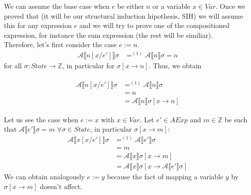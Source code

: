 \documentclass{article}
\begin{document}
\begin{enumerate}
\begin{enumerate}
        We can assume the base case when $e$ be either $n$ or a variable $x \in Var$. Once we proved that (it will be our structural induction hipothesis, SIH) we will assume this for any expression $e$ and we will try to prove one of the compositioned expression, for instance the sum expression (the rest will be similiar).\\
        
        Therefore, let's first consider the case  \mbox{\boldmath $e := n$}.
        \begin{align*}
        \mathcal{A}\llbracket n[x/e'] \rrbracket \sigma &=^{(1)} \mathcal{A}\llbracket n \rrbracket \sigma = n
        \end{align*}
        for all $\sigma: State \longrightarrow \mathbb Z$, in particular for $\sigma [x \rightarrow n ]$. Thus, we obtain
        
        \begin{align*}
        \begin{split}
        \mathcal{A}\llbracket n[x/e'] \rrbracket \sigma & =^{(1)} \mathcal{A}\llbracket n \rrbracket \sigma \\
        & = n \\
        & = \mathcal{A}\llbracket n \rrbracket \sigma [x \rightarrow n]
        \end{split}
        \end{align*}
        
        Let us see the case when \mbox{\boldmath $e := x$} with $x \in Var$. Let $e' \in AExp$ and $m \in \mathbb Z$ be such that $\mathcal{A}\llbracket e' \rrbracket \sigma = m$  $\forall \sigma \in State$, in particular $\sigma [x \rightarrow m]$:
        \begin{equation*}
        \begin{split}
        \mathcal{A}\llbracket x[x/e'] \rrbracket \sigma & =^{(1)} \mathcal{A}\llbracket e' \rrbracket \sigma \\
        & = m\\
        & = \mathcal{A}\llbracket x \rrbracket \sigma[x \rightarrow m] \\
        & = \mathcal{A}\llbracket x \rrbracket \sigma[x \rightarrow \mathcal{A}\llbracket e' \rrbracket \sigma]
        \end{split}
        \end{equation*}
        We can obtain analogously \mbox{\boldmath $e := y$} because the fact of mapping a variable $y$ by $\sigma[x \rightarrow m]$ doesn't affect.\\
        

\end{enumerate}
\end{enumerate}
\end{document}
